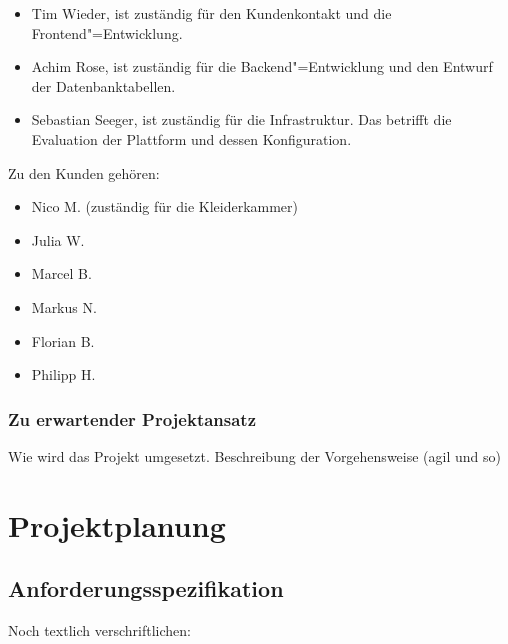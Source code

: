 \begin{itemize}
\item Tim Wieder, ist zuständig für den Kundenkontakt und die Frontend"=Entwicklung.
\item Achim Rose, ist zuständig für die Backend"=Entwicklung und den Entwurf der Datenbanktabellen. 
\item Sebastian Seeger, ist zuständig für die Infrastruktur. Das betrifft die Evaluation der Plattform und dessen Konfiguration.
\end{itemize}

Zu den Kunden gehören: 

\begin{itemize}
\item Nico M. (zuständig für die Kleiderkammer)
\item Julia W.
\item Marcel B.
\item Markus N.
\item Florian B.
\item Philipp H.
\end{itemize}

\subsubsection{Zu erwartender Projektansatz}

Wie wird das Projekt umgesetzt. Beschreibung der Vorgehensweise (agil und so)

\section{Projektplanung}\label{sec:Projektplanung}
\subsection{Anforderungsspezifikation}

Noch textlich verschriftlichen:

